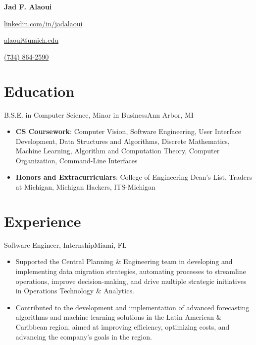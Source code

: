 \documentclass[letterpaper,10.5pt]{article}
\begin{document}
\begin{center}
    \Huge{\textbf{Jad F. Alaoui}}

    \begin{itemize*}
        \item[] \href{https://linkedin.com/in/jadalaoui}{linkedin.com/in/jadalaoui}
        \item \href{mailto:alaoui@umich.edu}{alaoui@umich.edu}
        \item \href{tel:+17348642590}{(734) 864-2590}
    \end{itemize*}
\end{center}

\section{Education}
{B.S.E. in Computer Science, Minor in Business}{Ann Arbor, MI}
\begin{itemize}
    \item \textbf{CS Coursework}: Computer Vision, Software Engineering, User Interface Development, Data Structures and Algorithms, Discrete Mathematics, Machine
          Learning, Algorithm and Computation Theory, Computer Organization, Command-Line Interfaces
    \item \textbf{Honors and Extracurriculars}: College of Engineering Dean's List, Traders at Michigan, Michigan Hackers, ITS-Michigan
\end{itemize}

\section{Experience}
{Software Engineer, Internship}{Miami, FL}
\begin{itemize}
    \item Supported the Central Planning \& Engineering team in developing and implementing data migration strategies, automating processes to streamline operations, improve decision-making, and drive multiple strategic initiatives in Operations Technology \& Analytics.
    
    \item Contributed to the development and implementation of advanced forecasting algorithms and machine learning solutions in the Latin American \& Caribbean region, aimed at improving efficiency, optimizing costs, and advancing the company's goals in the region.
\end{itemize}
\end{document}
